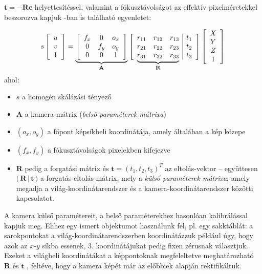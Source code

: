 $\mathbf{t} = -\mathbf{R}\mathbf{c}$ helyettesítéssel, valamint a fókusztávolságot az effektív pixelméretekkel beszorozva kapjuk \cite{camera-calib}-ban is található egyenletet:

\[s \left[\begin{array}{c}
u \\ 
v \\
1
\end{array}\right] = \underbrace{\left[\begin{array}{ccc}
f_x & 0 & o_x \\ 
0 & f_y & o_y \\
0 & 0 & 1
\end{array}\right]}_{\mathbf{A}} \left[\begin{array}{ccc|cc}
r_{11} & r_{12} & r_{13} & t_1 \\ 
r_{21} & r_{22} & r_{23} & t_2 \\
\undermat{\mathbf{R}}{r_{31} & r_{32} & r_{33}} & t_3 \\
\end{array}\right] \left[\begin{array}{c}
X \\ 
Y \\
Z \\
1
\end{array}\right]\]
ahol:
\begin{itemize}[itemsep=0pt]
\item $s$ a homogén skálázási tényező
\item $\mathbf{A}$ a kamera-mátrix (\textit{belső paraméterek mátrixa})
\item $(o_x, o_y)$ a főpont képsíkbeli koordinátája, amely általában a kép közepe
\item $(f_x, f_y)$ a fókusztávolságok pixelekben kifejezve
\item $\mathbf{R}$ pedig a forgatási mátrix és $\mathbf{t} = (t_1, t_2, t_3)^T$ az eltolás-vektor -- együttesen $\Big(\,\mathbf{R}\,|\,\mathbf{t}\,\Big)$ a forgatás-eltolás mátrix, mely a \textit{külső paraméterek mátrixa}; amely megadja a világ-koordinátarendszer és a kamera-koordinátarendszer közötti kapcsolatot.
\end{itemize}

A kamera külső paramétereit, a belső paraméterekhez hasonlóan kalibrálással kapjuk meg. Ehhez egy ismert objektumot használunk fel, pl. egy sakktáblát: a sarokpontokat a világ-koordinátarend\-szerben koordinátázzuk például úgy, hogy azok az $x$-$y$ síkba essenek, 3. koordinátájukat pedig fixen zérusnak választjuk. Ezeket a világbeli koordinátákat a képpontoknak megfeleltetve meghatározható $\mathbf{R}$ és $\mathbf{t}$ \cite{camera-calib}, feltéve, hogy a kamera képét már az előbbiek alapján rektifikáltuk.

